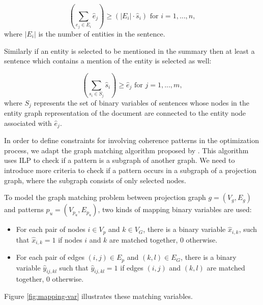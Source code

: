 \begin{equation}
\label{eq:const-2}
( \sum_{e_j\in E_i}{\hat{e}_j} )  \ge (|E_i| \cdot \hat{s}_i) \text{   for   }i = 1,...,n,
\end{equation} 
where $|E_i|$ is the number of entities in the sentence.  

Similarly if an entity is selected to be mentioned in the summary then at least a sentence which contains a mention of the entity is selected as well:   

\begin{equation}
(\sum_{s_i \in S_j}{\hat{s}_i}) \ge \hat{e}_j\text{ for }j = 1,...,m,
\end{equation}
where $S_j$ represents the set of binary variables of sentences whose nodes in the entity graph representation of the document are connected to the entity node associated with $\hat{e}_j$.  

In order to define constraints for involving coherence patterns in the optimization process, we adapt the graph matching algorithm proposed by .
This algorithm uses ILP to check if a pattern is a subgraph of another graph. 
We need to introduce more criteria to check if a pattern occurs in a subgraph of a projection graph,  where the subgraph consists of only selected nodes. 

To model the graph matching problem between projection graph $g=(V_{g},E_{g})$ and patterns $p_{u}=(V_{p_{u}},E_{p_{u}})$, two kinds of mapping binary variables are used: 

\begin{itemize}

	\item 
	For each pair of nodes $i \in V_{p}$ and $k \in V_G$, there is a binary variable $\hat{x}_{i,k}$, such that $\hat{x}_{i,k} = 1$ if nodes $i$ and $k$ are matched together, $0$ otherwise. 

	\item For each pair of edges $(i,j) \in E_{p}$ and $(k,l) \in E_G$, there is a binary variable $\hat{y}_{ij,kl}$ such that $\hat{y}_{ij,kl} = 1$ if edges $(i,j)$ and $(k,l)$ are matched together, $0$ otherwise.

\end{itemize}

Figure \ref{fig:mapping-var} illustrates these matching variables. 

